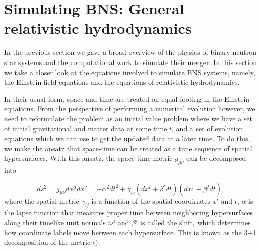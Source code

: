 


\section{Simulating BNS: General relativistic hydrodynamics}

In the previous section we gave a broad overview of the physics of binary neutron star systems and the computational work to simulate their merger. In this section we take a closer look at the equations involved to simulate BNS systems, namely, the Einstein field equations and the equations of relativistic hydrodynamics.

In their usual form, space and time are treated on equal footing in the Einstein equations. From the perspective of performing a numerical evolution however, we need to reformulate the problem as an initial value problem where we have a set of initial gravitational and matter data at some time $t$, and a set of evolution equations which we can use to get the updated data at a later time. To do this, we make the ansatz that space-time can be treated as a time sequence of spatial hypersurfaces. With this ansatz, the space-time metric $g_{\mu\nu}$ can be decomposed into

\begin{equation}
\label{eq:4}
ds^{2} = g_{\mu\nu}dx^{\mu}dx^{\nu} = -\alpha^2dt^2 + \gamma_{ij}(dx^i+\beta^idt)(dx^j+\beta^jdt),
\end{equation}
%
where the spatial metric $\gamma_{ij}$ is a function of the spatial coordinates $x^{i}$ and $t$, $\alpha$ is the lapse function that measures proper time between neighboring hypersurfaces along their timelike unit normals $n^{\mu}$ and $\beta^i$ is called the shift, which determines how coordinate labels move between each hypersurface. This is known as the 3+1 decomposition of the metric (\cite{arnowitt1959dynamical}).

